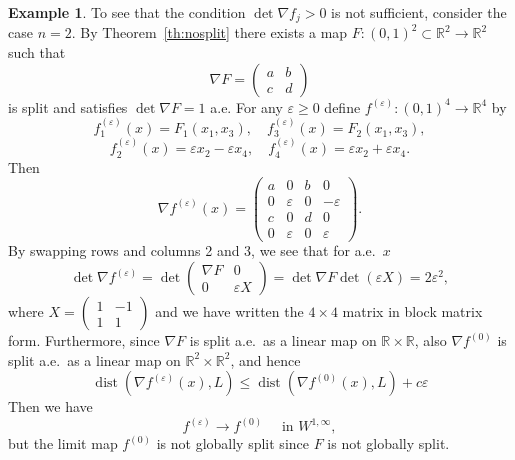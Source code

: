 \documentclass[titlepage]{amsart}
\numberwithin{equation}{section}
\theoremstyle{plain}
\theoremstyle{definition}
\newtheorem{example}[equation]{Example}
\theoremstyle{remark}
\newcommand{\dist}{\operatorname{dist}}
\newcommand{\eps}{\varepsilon}
\newcommand{\R}{\mathbb{R}}
\newcommand{\g}{\nabla }
\begin{document}
\begin{example}  \label{ex:counterexample_det_bigger_zero} 
To see that the condition $\det \g f_j >  0$ is not sufficient, 
consider the case $n=2$. 
By Theorem~\ref{th:nosplit} there exists a map $F: (0,1)^2 \subset \R^2 \to \R^2$
such that  
$$
\g F = \begin{pmatrix} a & b \\ c & d\end{pmatrix}
$$ 
is split and satisfies $\det \g F = 1$ a.e. 
For any $\eps\geq 0$ define $f^{(\eps)}:(0,1)^4\to\R^4$ by
$$ f^{(\eps)}_1(x) = F_1(x_1, x_3), \quad f^{(\eps)}_3(x) = F_2(x_1, x_3), $$
$$ f^{(\eps)}_2(x) = \eps x_2  - \eps x_4, \quad
f^{(\eps)}_4(x) = \eps x_2 + \eps x_4.$$
Then 
$$ 
\g f^{(\eps)}(x) = \begin{pmatrix}  a & 0 & b & 0 \\
0 & \eps & 0 & -\eps\\
c & 0 & d & 0 \\
0 &\eps & 0 &  \eps 
\end{pmatrix}.
$$
By swapping rows and columns 2 and 3, we see that for a.e.~$x$
$$
\det \g f^{(\eps)}=\det \begin{pmatrix}  \g F&0\\ 0&\eps X \end{pmatrix}=\det \g F\det(\eps X)=2\eps ^2, 
$$
where $X=\begin{pmatrix} 1&-1\\ 1&1\end{pmatrix}$ and we have written the $4\times 4$ matrix in block matrix form. Furthermore, since $\g F$ is split a.e.~as a linear map on $\R\times\R$, also $\g f^{(0)}$ is split a.e.~as a linear map on $\R^2\times\R^2$, and hence 
$$ 
\dist(\g f^{(\eps)}(x), L) \leq \dist(\g f^{(0)}(x), L) + c\eps
$$
Then we have
$$
f^{(\eps)}\to f^{(0)}\quad \textrm{ in }W^{1, \infty},
$$
but the limit map $f^{(0)}$ is not globally split since $F$ is 
not globally split. 
\end{example}
\end{document}

